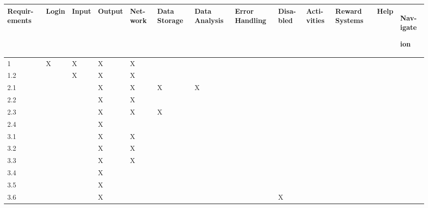\documentclass[12pt]{article}
\begin{document}
 \begin{longtable}{ |p{1cm}|p{0.8cm}|p{0.8cm}|p{1.2cm}|p{0.8cm}|p{0.8cm}|p{0.8cm}|p{0.8cm}|p{0.8cm}|p{0.8cm}|p{1.2cm}|p{0.8cm}|p{0.8cm}|  }
 \hline
 

 Requir-ements & Login & Input & Output & Net-work & Data Storage & Data Analysis &Error Handling &Disa-bled &Acti-vities &Reward Systems & Help & Nav-igate

 ion\\

 \hline

 1& X & X  & X  & X  &   &   &   &   &   &   &   &\\

 \hline

 1.2&  &X   &X   & X  &   &   &   &   &   &   &   &\\

 \hline

 2.1&  &   &  X & X  &  X &  X &   &   &   &   &   &\\

 \hline

 2.2&  &   & X  & X  &   &   &   &   &   &   &   &\\

 \hline

 2.3&  &   & X  & X  &  X &   &   &   &   &   &   &\\

 \hline

 2.4&  &   & X  &   &   &   &   &   &   &   &   &\\

 \hline

 3.1&  &   & X  & X  &   &   &   &   &   &   &   &\\

 \hline

 3.2&  &   & X  & X  &  &   &   &   &   &   &   &\\

 \hline

 3.3&  &   & X  & X  &  &   &   &   &   &   &   &\\

 \hline

 3.4&  &   & X  &   &   &   &   &   &   &   &   &\\

 \hline

 3.5&  &   &  X &   &   &   &   &   &   &   &   &\\

 \hline

 3.6&  &   &  X &   &   &   &   & X  &   &   &   &\\


\end{longtable}
\end{document}
